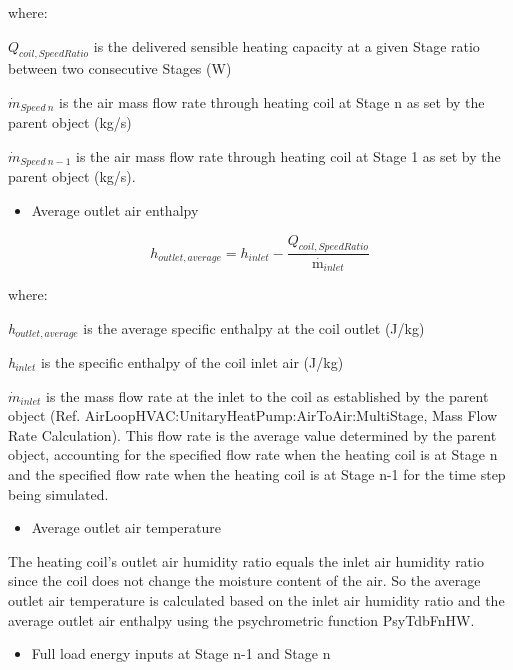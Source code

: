 where:

\({{Q_{coil,SpeedRatio}}}\) is the delivered sensible heating capacity at a given Stage ratio between two consecutive Stages (W)

\(\dot{m}_{Speed~n}\) is the air mass flow rate through heating coil at Stage n as set by the parent object (kg/s)

\(\dot{m}_{Speed~n-1}\) is the air mass flow rate through heating coil at Stage 1 as set by the parent object (kg/s).

\begin{itemize}
  \item Average outlet air enthalpy
\end{itemize}

\begin{equation}
  h_{outlet,average} = h_{inlet} - \frac{Q_{coil,SpeedRatio}}{{\mathop m\limits^\cdot }_{inlet}}
\end{equation}

where:

\emph{h\(_{outlet,average}\)} is the average specific enthalpy at the coil outlet (J/kg)

\emph{h\(_{inlet}\)} is the specific enthalpy of the coil inlet air (J/kg)

\({\dot m_{inlet}}\) is the mass flow rate at the inlet to the coil as established by the parent object (Ref. AirLoopHVAC:UnitaryHeatPump:AirToAir:MultiStage, Mass Flow Rate Calculation). This flow rate is the average value determined by the parent object, accounting for the specified flow rate when the heating coil is at Stage n and the specified flow rate when the heating coil is at Stage n-1 for the time step being simulated.

\begin{itemize}
  \item Average outlet air temperature
\end{itemize}

    The heating coil's outlet air humidity ratio equals the inlet air humidity ratio since the coil does not change the moisture content of the air. So the average outlet air temperature is calculated based on the inlet air humidity ratio and the average outlet air enthalpy using the psychrometric function PsyTdbFnHW.

\begin{itemize}
  \item
    Full load energy inputs at Stage n-1 and Stage n
\end{itemize}

